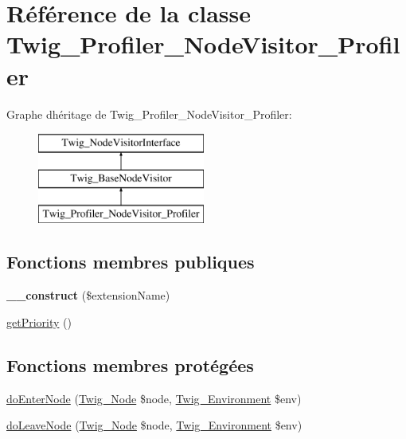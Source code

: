 \hypertarget{class_twig___profiler___node_visitor___profiler}{}\section{Référence de la classe Twig\+\_\+\+Profiler\+\_\+\+Node\+Visitor\+\_\+\+Profiler}
\label{class_twig___profiler___node_visitor___profiler}
Graphe d\textquotesingle{}héritage de Twig\+\_\+\+Profiler\+\_\+\+Node\+Visitor\+\_\+\+Profiler\+:\begin{figure}[H]
\begin{center}
\leavevmode
\includegraphics[height=3.000000cm]{class_twig___profiler___node_visitor___profiler}
\end{center}
\end{figure}
\subsection*{Fonctions membres publiques}
\begin{DoxyCompactItemize}
\item 
{\bfseries \+\_\+\+\_\+construct} (\$extension\+Name)\hypertarget{class_twig___profiler___node_visitor___profiler_a152cb2555207b5397f22388c95600aec}{}\label{class_twig___profiler___node_visitor___profiler_a152cb2555207b5397f22388c95600aec}

\item 
\hyperlink{class_twig___profiler___node_visitor___profiler_a1e7a3c168dcd0901a0d2669c67575b55}{get\+Priority} ()
\end{DoxyCompactItemize}
\subsection*{Fonctions membres protégées}
\begin{DoxyCompactItemize}
\item 
\hyperlink{class_twig___profiler___node_visitor___profiler_a58d59325d3add0c1004f6a5cfb2562af}{do\+Enter\+Node} (\hyperlink{class_twig___node}{Twig\+\_\+\+Node} \$node, \hyperlink{class_twig___environment}{Twig\+\_\+\+Environment} \$env)
\item 
\hyperlink{class_twig___profiler___node_visitor___profiler_a7e9db0312cbd70344096235921930dd2}{do\+Leave\+Node} (\hyperlink{class_twig___node}{Twig\+\_\+\+Node} \$node, \hyperlink{class_twig___environment}{Twig\+\_\+\+Environment} \$env)
\end{DoxyCompactItemize}


